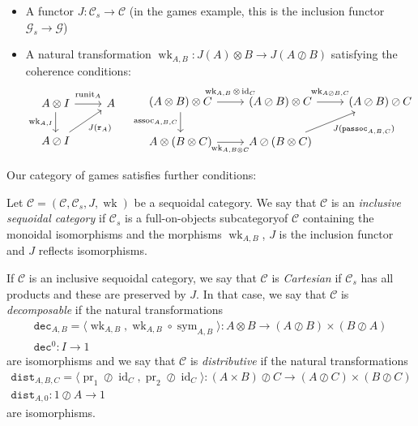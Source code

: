 \documentclass[a4paper,UKenglish]{lipics-v2016}
\theoremstyle{plain}
\theoremstyle{definition}
\newcommand*\from{\colon}
\DeclareMathOperator{\id}{id}
\DeclareMathOperator{\pr}{pr}
\newcommand{\tensor}{\otimes}
\newcommand{\sequoid}{\oslash}
\newcommand{\comp}[2]{#1 \circ #2}
\newcommand{\C}{\mathcal C}
\newcommand{\G}{\mathcal G}
\DeclareMathOperator{\assoc}{assoc}
\DeclareMathOperator{\runit}{runit}
\DeclareMathOperator{\sym}{sym}
\DeclareMathOperator{\wk}{wk}
\newcommand{\passoc}{{\mathtt{passoc}}}
\newcommand{\run}{{\mathtt{r}}}
\newcommand{\dist}{{\mathtt{dist}}}
\newcommand{\dec}{{\mathtt{dec}}}
\newlength{\arrow}
\begin{document}
\begin{definition}
\begin{itemize}
      \item A functor $J\from \C_s\to\C$ (in the games example, this is the inclusion functor $\G_s\to\G$)

      \item A natural transformation $\wk_{A,B}\from J(A)\tensor B\to J(A\sequoid B)$ satisfying the coherence conditions:
      \begin{equation*}
        \begin{tikzcd}
          A \tensor I \arrow[r, "\runit_A" yshift=0.3em] \arrow[d, "\wk_{A,I}"']
            & A \\
          A \sequoid I \arrow[ur, "J(\run_A)"']
            &
        \end{tikzcd}
        \quad
        \begin{tikzcd}
          (A \tensor B) \tensor C \arrow[r, "\wk_{A,B}\tensor\id_C" yshift=0.3em] \arrow[d, "\assoc_{A,B,C}"']
            & (A \sequoid B) \tensor C \arrow[r, "\wk_{A\sequoid B, C}" yshift=0.3em]
              & (A \sequoid B) \sequoid C\\
          A \tensor (B \tensor C) \arrow[r, "\wk_{A,B\tensor C}"']
            & A \sequoid (B \tensor C) \arrow[ur, "J(\passoc_{A,B,C})"']
              &
        \end{tikzcd}
      \end{equation*}
  \end{itemize}
\end{definition}

Our category of games satisfies further conditions:

\begin{definition}
  Let $\C=(\C,\C_s,J,\wk)$ be a sequoidal category.  We say that $\C$ is an \emph{inclusive sequoidal category} if $\C_s$ is a full-on-objects subcategoryof $\C$ containing the monoidal isomorphisms and the morphisms $\wk_{A,B}$, $J$ is the inclusion functor and $J$ reflects isomorphisms.

  If $\C$ is an inclusive sequoidal category, we say that $\C$ is \emph{Cartesian} if $\C_s$ has all products and these are preserved by $J$.  In that case, we say that $\C$ is \emph{decomposable} if the natural transformations
  \begin{gather*}
    \dec_{A,B} = \langle \wk_{A,B}, \comp{\wk_{A,B}}{\sym_{A,B}}\rangle\from A\tensor B\to (A\sequoid B)\times (B\sequoid A) \\
    \dec^0 \from I \to 1
  \end{gather*}
  are isomorphisms and we say that $\C$ is \emph{distributive} if the natural transformations
  \begin{gather*}
    \dist_{A,B,C} = \langle \pr_1\sequoid \id_C,\pr_2\sequoid\id_C\rangle\from (A\times B)\sequoid C\to (A\sequoid C)\times (B\sequoid C) \\
    \dist_{A,0}\from 1\sequoid A\to 1
  \end{gather*}
  are isomorphisms.
\end{definition}
\end{document}
